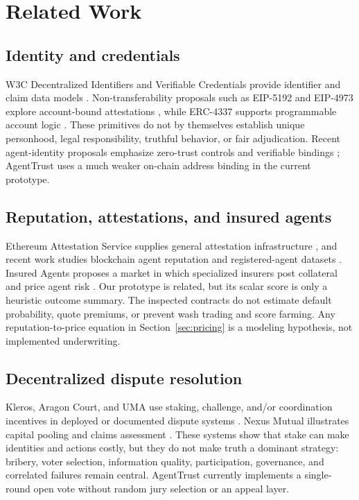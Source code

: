 \section{Related Work}
\label{sec:related-work}

\subsection{Identity and credentials}
W3C Decentralized Identifiers and Verifiable Credentials provide identifier and claim data models
\cite{w3c-did,w3c-vc}. Non-transferability proposals such as EIP-5192 and EIP-4973 explore
account-bound attestations \cite{eip-5192,eip-4973}, while ERC-4337 supports programmable account
logic \cite{eip-4337}. These primitives do not by themselves establish unique personhood, legal
responsibility, truthful behavior, or fair adjudication. Recent agent-identity proposals emphasize
zero-trust controls and verifiable bindings \cite{zero-trust,binding-id}; AgentTrust uses a much
weaker on-chain address binding in the current prototype.

\subsection{Reputation, attestations, and insured agents}
Ethereum Attestation Service supplies general attestation infrastructure \cite{eas}, and recent work
studies blockchain agent reputation and registered-agent datasets \cite{agent-rep,agent-dataset}.
Insured Agents proposes a market in which specialized insurers post collateral and price agent risk
\cite{insured-agents}. Our prototype is related, but its scalar score is only a heuristic outcome
summary. The inspected contracts do not estimate default probability, quote premiums, or prevent
wash trading and score farming. Any reputation-to-price equation in Section~\ref{sec:pricing} is a
modeling hypothesis, not implemented underwriting.

\subsection{Decentralized dispute resolution}
Kleros, Aragon Court, and UMA use staking, challenge, and/or coordination incentives in deployed or
documented dispute systems \cite{kleros,aragon,uma}. Nexus Mutual illustrates capital pooling and
claims assessment \cite{nexus-mutual}. These systems show that stake can make identities and actions
costly, but they do not make truth a dominant strategy: bribery, voter selection, information quality,
participation, governance, and correlated failures remain central. AgentTrust currently implements a
single-round open vote without random jury selection or an appeal layer.

